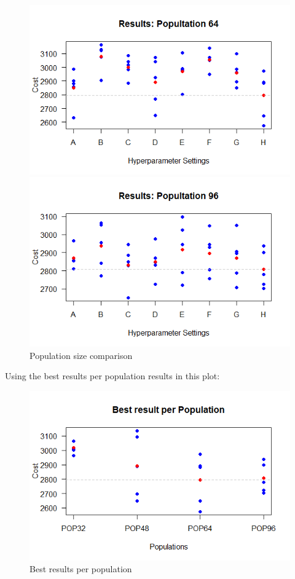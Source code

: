 \begin{figure}[H]
	\begin{minipage}[b]{0.5\linewidth}
		\centering
		\includegraphics[width=1\linewidth]{simulations/population/plots/64} 
	\end{minipage}%
	\begin{minipage}[b]{0.5\linewidth}
		\centering
		\includegraphics[width=1\linewidth]{simulations/population/plots/96} 
	\end{minipage}
	\caption{Population size comparison}
\end{figure}

Using the best results per population results in this plot:
\begin{figure}[H] 
	\includegraphics[width=1\linewidth]{simulations/population/plots/merged}
	\caption{Best results per population} 
\end{figure}


